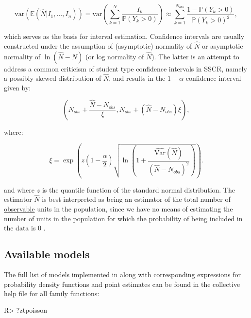 \documentclass[
]{jss}
\newcommand{\1}{\mathcal{I}} \newcommand{\bZero}{\boldsymbol{0}}
\begin{document}
\begin{equation*}
  \text{var}\left(\mathbb{E}(\hat{N}|I_{1},\dots,I_{n})\right) =
  \text{var}\left(\sum_{k=1}^{N}\frac{I_{k}}{\mathbb{P}(Y_{k}>0)}\right)
  \approx\sum_{k=1}^{N_{obs}}\frac{1-\mathbb{P}(Y_{k}>0)}{\mathbb{P}(Y_{k}>0)^{2}},
\end{equation*}

which serves as the basis for interval estimation. Confidence intervals
are usually constructed under the assumption of (asymptotic) normality
of \(\hat{N}\) or asymptotic normality of \(\ln(\hat{N}-N)\) (or log
normality of \(\hat{N}\)). The latter is an attempt to address a common
criticism of student type confidence intervals in SSCR, namely a
possibly skewed distribution of \(\hat{N}\), and results in the
\(1-\alpha\) confidence interval given by:

\begin{equation*}
  \left(N_{obs}+\frac{\hat{N}-N_{obs}}{\xi},N_{obs} +
  \left(\hat{N}-N_{obs}\right)\xi\right),
\end{equation*}

where:

\begin{equation*}
  \xi = \exp\left(z\left(1-\frac{\alpha}{2}\right)
  \sqrt{\ln\left(1+\frac{\widehat{\text{Var}}(\hat{N})}{\left(\hat{N}-N_{obs}\right)^{2}}\right)}\right).
\end{equation*}

and where \(z\) is the quantile function of the standard normal
distribution. The estimator \(\hat{N}\) is best interpreted as being an
estimator of the total number of \underline{observable} units in the
population, since we have no means of estimating the number of units in
the population for which the probability of being included in the data
is \(0\) \citep[cf.][]{ztpoisson}.

\subsection{Available models}\label{available-models}

The full list of models implemented in  along with
corresponding expressions for probability density functions and point
estimates can be found in the collective help file for all family
functions:

\begin{CodeChunk}
\begin{CodeInput}
R> ?ztpoisson
\end{CodeInput}
\end{CodeChunk}
\end{document}
